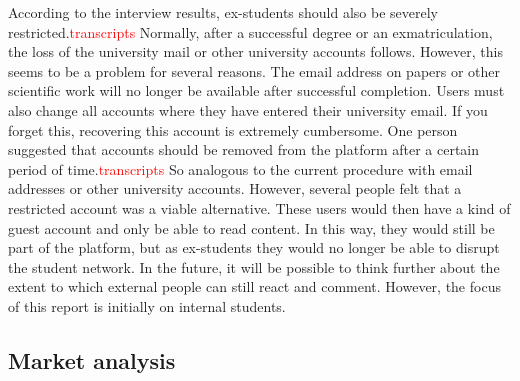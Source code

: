 According to the interview results, ex-students should also be severely restricted.\textcolor{red}{transcripts}
Normally, after a successful degree or an exmatriculation, the loss of the university mail or other university accounts follows.
However, this seems to be a problem for several reasons.
The email address on papers or other scientific work will no longer be available after successful completion.
Users must also change all accounts where they have entered their university email.
If you forget this, recovering this account is extremely cumbersome.
One person suggested that accounts should be removed from the platform after a certain period of time.\textcolor{red}{transcripts}
So analogous to the current procedure with email addresses or other university accounts.
However, several people felt that a restricted account was a viable alternative.
These users would then have a kind of guest account and only be able to read content.
In this way, they would still be part of the platform, but as ex-students they would no longer be able to disrupt the student network.
In the future, it will be possible to think further about the extent to which external people can still react and comment.
However, the focus of this report is initially on internal students.




\subsection{Market analysis}
